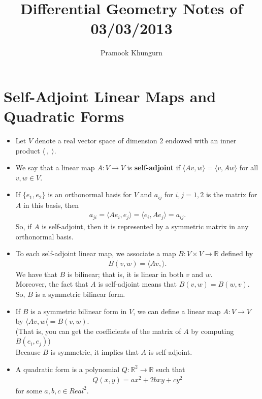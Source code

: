 \documentclass[10pt]{article}
\title{Differential Geometry Notes of 03/03/2013}
\author{Pramook Khungurn}
\newcommand{\ra}{\rightarrow}
\newcommand{\Real}{\mathbb{R}}
\begin{document}
  \maketitle

  \section{Self-Adjoint Linear Maps and Quadratic Forms}

  \begin{itemize}
    \item Let $V$ denote a real vector space of dimension $2$ endowed with an inner product $\langle\ ,\ \rangle$.

    \item We say that a linear map $A: V \ra V$ is {\bf self-adjoint} if $\langle Av, w \rangle = \langle v, Aw\rangle$ for all $v, w \in V$.

    \item If $\{ e_1, e_2 \}$ is an orthonormal basis for $V$ and $a_{ij}$ for $i,j = 1,2$ is the matrix for $A$ in this basis, then
    \begin{align*}
      a_{ji} = \langle Ae_i, e_j \rangle = \langle e_i, Ae_j \rangle = a_{ij}.
    \end{align*}
    So, if $A$ is self-adjoint, then it is represented by a symmetric matrix in any orthonormal basis.

    \item To each self-adjoint linear map, we associate a map $B: V \times V \ra \Real$ defined by
    \begin{align*}
      B(v,w) = \langle Av, \rangle.
    \end{align*}
    We have that $B$ is bilinear; that is, it is linear in both $v$ and $w$.\\
    Moreover, the fact that $A$ is self-adjoint means that $B(v,w) = B(w,v)$.\\
    So, $B$ is a symmetric bilinear form.

    \item If $B$ is a symmetric bilinear form in $V$, we can define a linear map $A: V \ra V$ by $\langle Av, w \langle = B(v,w).$\\
    (That is, you can get the coefficients of the matrix of $A$ by computing $B(e_i, e_j)$)\\
    Because $B$ is symmetric, it implies that $A$ is self-adjoint.

    \item A quadratic form is a polynomial $Q: \Real^2 \ra \Real$ such that
    \begin{align*}
      Q(x,y) = ax^2 + 2bxy + cy^2
    \end{align*}
    for some $a, b, c \in Real^2$.


\end{itemize}
\end{document}
